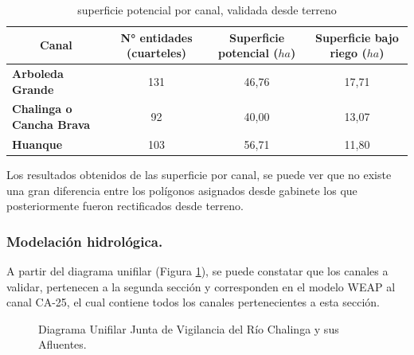 \documentclass[]{article}
\begin{document}
\begin{table}[H]
\centering
\caption{superficie potencial por canal, validada desde terreno}
\label{my-label}
\begin{tabular}{|l|c|c|c|}
\hline
\multicolumn{1}{|c|}{\textbf{Canal}} & \textbf{N° entidades (cuarteles)} & \textbf{Superficie potencial ($ha$)} & \textbf{Superficie bajo riego ($ha$)} \\ \hline
\textbf{Arboleda Grande}             & 131                               & 46,76            &     17,71   \\ \hline
\textbf{Chalinga o Cancha Brava}     & 92                                & 40,00                &  13,07     \\ \hline
\textbf{Huanque}                     & 103                               & 56,71             &    11,80   \\ \hline
\end{tabular}
\end{table}

Los resultados obtenidos de las superficie por canal, se puede ver que no existe una gran diferencia entre los polígonos asignados desde gabinete los que posteriormente fueron rectificados desde terreno.

\subsubsection{Modelación hidrológica.}

A partir del diagrama unifilar (Figura \ref{etiqueta_figura8}), se puede constatar que los canales a validar, pertenecen a la segunda sección y corresponden en el modelo WEAP al canal CA-25, el cual contiene todos los canales pertenecientes a esta sección.

\begin{figure}[H]
\begin{center}
\caption{Diagrama Unifilar Junta de Vigilancia del Río Chalinga y sus Afluentes.}
\label{etiqueta_figura8}
\end{center}
\end{figure}
\end{document}
